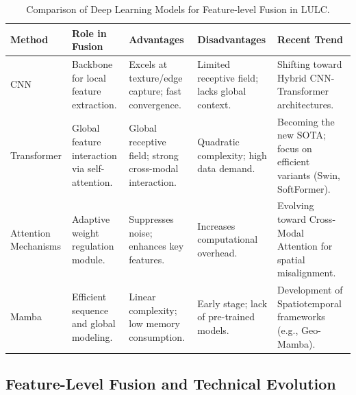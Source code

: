 \documentclass[]{interact}
\theoremstyle{plain}%
\theoremstyle{definition}
\theoremstyle{remark}
\begin{document}

\begin{table}[htb!]
	\centering
	\setlength{\belowcaptionskip}{5pt}
	\caption{Comparison of Deep Learning Models for Feature-level Fusion in LULC.}
	\label{tab:comparison_models}
	\footnotesize
	\renewcommand{\arraystretch}{1.4} %
	\begin{tabular}{@{} p{1.8cm} p{2.8cm} p{3.3cm} p{3.1cm} p{3.5cm} @{}}
		\toprule
		\textbf{Method} & \textbf{Role in Fusion} & \textbf{Advantages} & \textbf{Disadvantages} & \textbf{Recent Trend} \\ 
		\midrule
		CNN \citep{2,8,29,56} & Backbone for local feature extraction. & Excels at texture/edge capture; fast convergence. & Limited receptive field; lacks global context. & Shifting toward Hybrid CNN-Transformer architectures. \\ 
		\addlinespace[0.8em] %
		
		Transformer \citep{7,35,36,bazi2021vision,liu2024softformer} & Global feature interaction via self-attention. & Global receptive field; strong cross-modal interaction. & Quadratic complexity; high data demand. & Becoming the new SOTA; focus on efficient variants (Swin, SoftFormer). \\ 
		\addlinespace[0.8em]
		
		Attention Mechanisms \citep{46,47,zhang2023multimodal} & Adaptive weight regulation module. & Suppresses noise; enhances key features. & Increases computational overhead. & Evolving toward Cross-Modal Attention for spatial misalignment. \\ 
		\addlinespace[0.8em]
		
		Mamba \citep{5,49,53,he2024foundation} & Efficient sequence and global modeling. & Linear complexity; low memory consumption. & Early stage; lack of pre-trained models. & Development of Spatiotemporal frameworks (e.g., Geo-Mamba). \\ 
		\bottomrule
	\end{tabular}
\end{table}

\subsection{Feature-Level Fusion and Technical Evolution}
\end{document}
